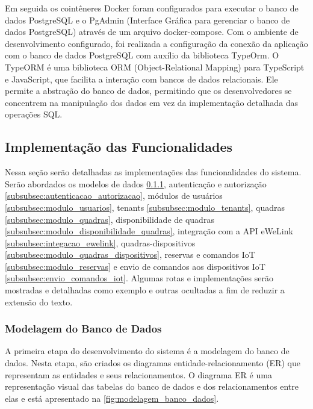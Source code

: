 Em seguida os cointêneres Docker foram configurados para executar o banco de dados PostgreSQL e o PgAdmin (Interface Gráfica para gerenciar o banco de dados PostgreSQL) através de um arquivo docker-compose. Com o ambiente de desenvolvimento configurado, foi realizada a configuração da conexão da aplicação com o banco de dados PostgreSQL com auxílio da biblioteca TypeOrm. O TypeORM é uma biblioteca ORM (Object-Relational Mapping) para TypeScript e JavaScript, que facilita a interação com bancos de dados relacionais. Ele permite a abstração do banco de dados, permitindo que os desenvolvedores se concentrem na manipulação dos dados em vez da implementação detalhada das operações SQL.

\subsection{Implementação das Funcionalidades}\label{subsec:implementacao_funcionalidades}

Nessa seção serão detalhadas as implementações das funcionalidades do sistema. Serão abordados os modelos de dados \ref{subsubsec:modelagem_banco_dados}, autenticação e autorização \ref{subsubsec:autenticacao_autorizacao}, módulos de usuários \ref{subsubsec:modulo_usuarios}, tenants \ref{subsubsec:modulo_tenants}, quadras \ref{subsubsec:modulo_quadras}, disponibilidade de quadras \ref{subsubsec:modulo_disponibilidade_quadras}, integração com a API eWeLink \ref{subsubsec:integacao_ewelink}, quadras-dispositivos \ref{subsubsec:modulo_quadras_dispositivos}, reservas e comandos IoT \ref{subsubsec:modulo_reservas} e envio de comandos aos dispositivos IoT \ref{subsubsec:envio_comandos_iot}. Algumas rotas e implementações serão mostradas e detalhadas como exemplo e outras ocultadas a fim de reduzir a extensão do texto.

\subsubsection{Modelagem do Banco de Dados}\label{subsubsec:modelagem_banco_dados}
A primeira etapa do desenvolvimento do sistema é a modelagem do banco de dados. Nesta etapa, são criados os diagramas entidade-relacionamento (ER) que representam as entidades e seus relacionamentos. O diagrama ER é uma representação visual das tabelas do banco de dados e dos relacionamentos entre elas e está apresentado na \autoref{fig:modelagem_banco_dados}.


